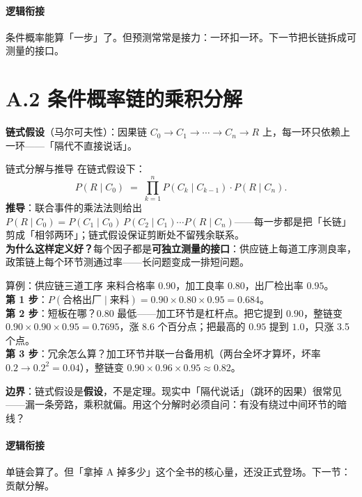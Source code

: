 \documentclass[../../main2.tex]{subfiles}
\begin{document}
\paragraph*{逻辑衔接}
	条件概率能算「一步」了。但预测常常是接力：一环扣一环。下一节把长链拆成可测量的接口。

\section{A.2 条件概率链的乘积分解}
\label{app:chain}


\begin{definitionbox}
	\textbf{链式假设}（马尔可夫性）：因果链 $C_0 \to C_1 \to \cdots \to C_n \to R$ 上，每一环只依赖上一环——「隔代不直接说话」。
\end{definitionbox}

\begin{mathbox}{链式分解与推导}
	在链式假设下：
	\[
	P(R \mid C_0) \;=\; \prod_{k=1}^{n} P(C_k \mid C_{k-1}) \cdot P(R \mid C_n).
	\]
	\textbf{推导}：联合事件的乘法法则给出
	$P(R \mid C_0) = P(C_1 \mid C_0) \, P(C_2 \mid C_1) \cdots P(R \mid C_n)$——每一步都是把「长链」剪成「相邻两环」；链式假设保证剪断处不留残余联系。\\
	\textbf{为什么这样定义好？}每个因子都是\textbf{可独立测量的接口}：供应链上每道工序测良率，政策链上每个环节测通过率——长问题变成一排短问题。
\end{mathbox}

\begin{mathbox}{算例：供应链三道工序}
	来料合格率 $0.90$，加工良率 $0.80$，出厂检出率 $0.95$。\\
	\textbf{第 1 步}：$P(\text{合格出厂} \mid \text{来料}) = 0.90 \times 0.80 \times 0.95 = 0.684$。\\
	\textbf{第 2 步}：短板在哪？$0.80$ 最低——加工环节是杠杆点。把它提到 $0.90$，整链变 $0.90 \times 0.90 \times 0.95 = 0.7695$，涨 8.6 个百分点；把最高的 $0.95$ 提到 $1.0$，只涨 3.5 个点。\\
	\textbf{第 3 步}：冗余怎么算？加工环节并联一台备用机（两台全坏才算坏，坏率 $0.2 \to 0.2^2 = 0.04$），整链变 $0.90 \times 0.96 \times 0.95 \approx 0.82$。\end{mathbox}

\textbf{边界}：链式假设是\textbf{假设}，不是定理。现实中「隔代说话」（跳环的因果）很常见——漏一条旁路，乘积就偏。用这个分解时必须自问：有没有绕过中间环节的暗线？

\paragraph*{逻辑衔接}
	单链会算了。但「拿掉 A 掉多少」这个全书的核心量，还没正式登场。下一节：贡献分解。
\end{document}
